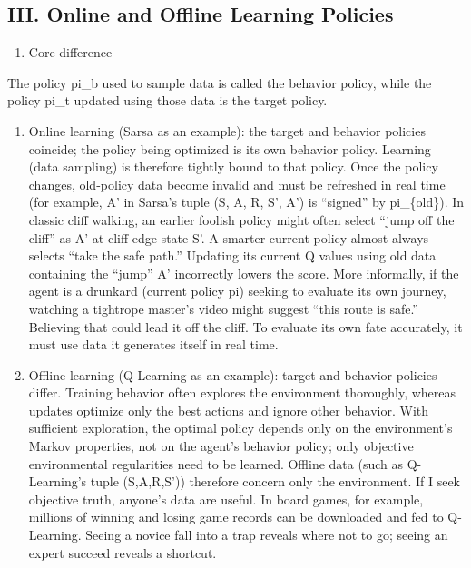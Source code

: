 \hypertarget{iii.-online-and-offline-learning-policies}{%
\subsection{III. Online and Offline Learning Policies}\label{iii.-online-and-offline-learning-policies}}

\begin{enumerate}
\def\labelenumi{\arabic{enumi}.}
\tightlist
\item
  Core difference
\end{enumerate}

The policy pi\_b used to sample data is called the behavior policy, while the policy pi\_t updated using those data is the target policy.

\begin{enumerate}
\def\labelenumi{(\arabic{enumi})}
\item
  Online learning (Sarsa as an example): the target and behavior policies coincide; the policy being optimized is its own behavior policy. Learning (data sampling) is therefore tightly bound to that policy. Once the policy changes, old-policy data become invalid and must be refreshed in real time (for example, A' in Sarsa's tuple (S, A, R, S', A') is ``signed'' by pi\_\{old\}). In classic cliff walking, an earlier foolish policy might often select ``jump off the cliff'' as A' at cliff-edge state S'. A smarter current policy almost always selects ``take the safe path.'' Updating its current Q values using old data containing the ``jump'' A' incorrectly lowers the score. More informally, if the agent is a drunkard (current policy pi) seeking to evaluate its own journey, watching a tightrope master's video might suggest ``this route is safe.'' Believing that could lead it off the cliff. To evaluate its own fate accurately, it must use data it generates itself in real time.
\item
  Offline learning (Q-Learning as an example): target and behavior policies differ. Training behavior often explores the environment thoroughly, whereas updates optimize only the best actions and ignore other behavior. With sufficient exploration, the optimal policy depends only on the environment's Markov properties, not on the agent's behavior policy; only objective environmental regularities need to be learned. Offline data (such as Q-Learning's tuple (S,A,R,S')) therefore concern only the environment. If I seek objective truth, anyone's data are useful. In board games, for example, millions of winning and losing game records can be downloaded and fed to Q-Learning. Seeing a novice fall into a trap reveals where not to go; seeing an expert succeed reveals a shortcut.
\end{enumerate}

